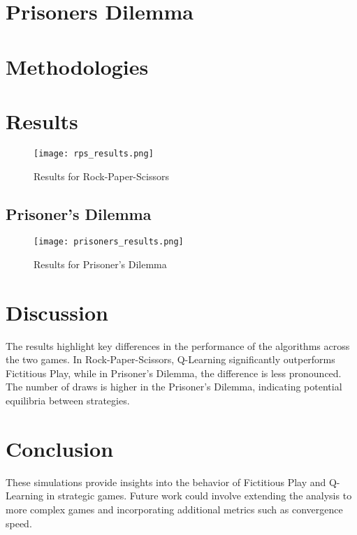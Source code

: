 \documentclass{article}
\begin{document}
\section{Prisoners Dilemma}

\section{Methodologies}


\section{Results}

\begin{figure}[h!]
\centering
\texttt{[image: rps\_results.png]}
\caption{Results for Rock-Paper-Scissors}
\end{figure}

\subsection*{Prisoner's Dilemma}

\begin{figure}[h!]
\centering
\texttt{[image: prisoners\_results.png]}
\caption{Results for Prisoner's Dilemma}
\end{figure}

\section*{Discussion}
The results highlight key differences in the performance of the algorithms across the two games. In Rock-Paper-Scissors, Q-Learning significantly outperforms Fictitious Play, while in Prisoner's Dilemma, the difference is less pronounced. The number of draws is higher in the Prisoner's Dilemma, indicating potential equilibria between strategies.

\section*{Conclusion}
These simulations provide insights into the behavior of Fictitious Play and Q-Learning in strategic games. Future work could involve extending the analysis to more complex games and incorporating additional metrics such as convergence speed.
\end{document}
